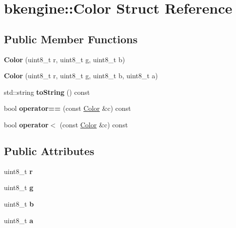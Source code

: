 \hypertarget{structbkengine_1_1Color}{}\section{bkengine\+:\+:Color Struct Reference}
\label{structbkengine_1_1Color}
\subsection*{Public Member Functions}
\begin{DoxyCompactItemize}
\item 
\mbox{\label{structbkengine_1_1Color_a5dd1068a86959dfc7a25930148b24d08}} 
{\bfseries Color} (uint8\+\_\+t r, uint8\+\_\+t g, uint8\+\_\+t b)
\item 
\mbox{\label{structbkengine_1_1Color_ab8f3c9a331a6573972030dab578e20a2}} 
{\bfseries Color} (uint8\+\_\+t r, uint8\+\_\+t g, uint8\+\_\+t b, uint8\+\_\+t a)
\item 
\mbox{\label{structbkengine_1_1Color_abb8258c40a757066e26538b6c4be9ed0}} 
std\+::string {\bfseries to\+String} () const
\item 
\mbox{\label{structbkengine_1_1Color_ac87cb4e25b3c6f87fa7a713fc757114b}} 
bool {\bfseries operator==} (const \hyperlink{structbkengine_1_1Color}{Color} \&c) const
\item 
\mbox{\label{structbkengine_1_1Color_acbf042e3979d8e6c6a62d7871d04303c}} 
bool {\bfseries operator$<$} (const \hyperlink{structbkengine_1_1Color}{Color} \&c) const
\end{DoxyCompactItemize}
\subsection*{Public Attributes}
\begin{DoxyCompactItemize}
\item 
\mbox{\label{structbkengine_1_1Color_ae1a6df2184f20c5407a09dfbd4427b09}} 
uint8\+\_\+t {\bfseries r}
\item 
\mbox{\label{structbkengine_1_1Color_adf6701cc0f56d6c473237411ec1b5b2e}} 
uint8\+\_\+t {\bfseries g}
\item 
\mbox{\label{structbkengine_1_1Color_aafbce92f95824ea1cf56f1766c2480fb}} 
uint8\+\_\+t {\bfseries b}
\item 
\mbox{\label{structbkengine_1_1Color_a062d260f16319d1865efe4151a58c109}} 
uint8\+\_\+t {\bfseries a}
\end{DoxyCompactItemize}
